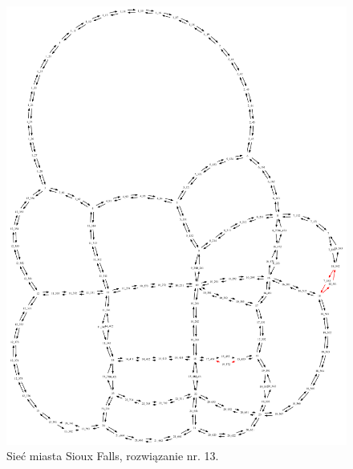 \documentclass[twoside,12pt]{report}
\begin{document}
\begin{figure}[ht]
\centering
\includegraphics[totalheight=0.580\textheight, angle=90]{img/sioux-out/13/network2}
\caption{Sieć miasta Sioux Falls, rozwiązanie nr. 13.}
\label{sioux13}
\end{figure}
\end{document}
